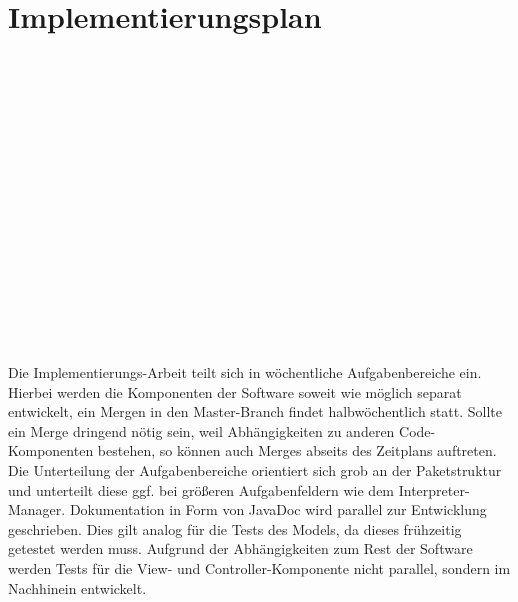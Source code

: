\documentclass[parskip=full,11pt,twoside]{scrartcl}
\begin{document}
\section{Implementierungsplan}
\begin{ganttchart}[x unit = 1.4cm, y unit chart = 0.95cm]{0}{4}
	\\
	\\
	\\
	\\
	\\
	\\

	\\
	\\
	\\
	\\
	\\
	\\

	\\
	\\

	\\
\end{ganttchart}
\newpage
Die Implementierungs-Arbeit teilt sich in wöchentliche Aufgabenbereiche ein. Hierbei werden die Komponenten der Software soweit wie möglich separat entwickelt, ein Mergen in den Master-Branch findet halbwöchentlich statt. Sollte ein Merge dringend nötig sein, weil Abhängigkeiten zu anderen Code-Komponenten bestehen, so können auch Merges abseits des Zeitplans auftreten. Die Unterteilung der Aufgabenbereiche orientiert sich grob an der Paketstruktur und unterteilt diese ggf. bei größeren Aufgabenfeldern wie dem Interpreter-Manager. Dokumentation in Form von JavaDoc wird parallel zur Entwicklung geschrieben. Dies gilt analog für die Tests des Models, da dieses frühzeitig getestet werden muss. Aufgrund der Abhängigkeiten zum Rest der Software werden Tests für die View- und Controller-Komponente nicht parallel, sondern im Nachhinein entwickelt.
\end{document}
